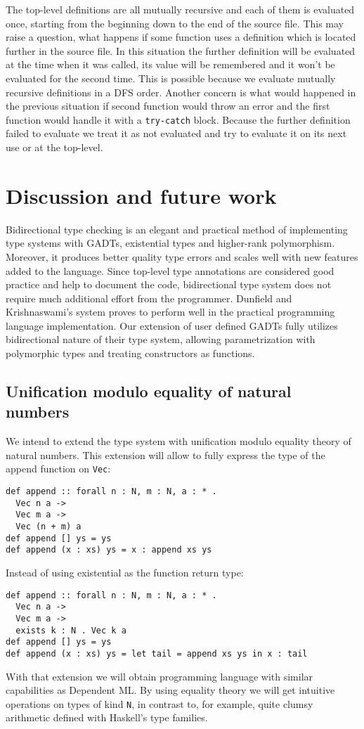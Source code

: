 \documentclass[declaration,shortabstract,english]{iithesis}
\begin{document}
The top-level definitions are all mutually recursive and each of them is evaluated once, starting from the beginning
down to the end of the source file. This may raise a question, what happens if some function uses a definition which is located
further in the source file. In this situation the further definition will be evaluated at the time when it was called,
its value will be remembered and it won't be evaluated for the second time. This is possible because we evaluate mutually recursive
definitions in a DFS order.
Another concern is what would happened in the previous situation if second function would throw an error and the first function would
handle it with a \verb+try-catch+ block. Because the further definition failed to evaluate we treat it as not evaluated and try to evaluate it
on its next use or at the top-level.

\chapter{Discussion and future work}
Bidirectional type checking is an elegant and practical method of implementing type systems with GADTs,
existential types and higher-rank polymorphism. Moreover, it produces better quality type errors
and scales well with new features added to the language. Since top-level type annotations are considered
good practice and help to document the code, bidirectional type system does not require much additional effort from the programmer.
Dunfield and Krishnaswami's system\cite{gadt-popl19} proves to perform well in the practical programming language implementation.
Our extension of user defined GADTs fully utilizes bidirectional nature of their type system,
allowing parametrization with polymorphic types and treating constructors as functions.

\section{Unification modulo equality of natural numbers}\label{natural}
We intend to extend the type system with unification modulo equality theory of natural numbers.
This extension will allow to fully express the type of the append function on \verb+Vec+:
\begin{verbatim}
def append :: forall n : N, m : N, a : * .
  Vec n a ->
  Vec m a ->
  Vec (n + m) a
def append [] ys = ys
def append (x : xs) ys = x : append xs ys
\end{verbatim}
Instead of using existential as the function return type:
\begin{verbatim}
def append :: forall n : N, m : N, a : * .
  Vec n a ->
  Vec m a ->
  exists k : N . Vec k a
def append [] ys = ys
def append (x : xs) ys = let tail = append xs ys in x : tail
\end{verbatim}
With that extension we will obtain programming language with similar capabilities as
Dependent ML\cite{DependentML}. By using equality theory we will get intuitive operations
on types of kind \verb+N+, in contrast to, for example, quite clumsy arithmetic
defined with Haskell's type families.
\end{document}
